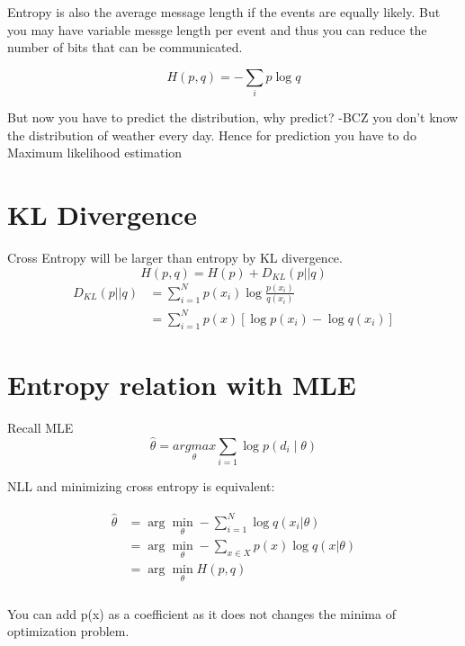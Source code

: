 Entropy is also the average message length if the events are equally likely. But you may have variable messge length per event and thus you can reduce the number of bits that can be communicated. 

\begin{equation}
    H(p,q) = - \underset{i}{\sum} p \log q
\end{equation}

But now you have to predict the distribution, why predict?  -BCZ you don't know the distribution of weather every day. Hence for prediction you have to do Maximum likelihood estimation

\section{KL Divergence}
Cross Entropy will be larger than entropy by KL divergence. 
\begin{equation}
    H(p,q) = H(p) + D_{KL}(p \vert \vert q)
\end{equation}
\begin{equation}
    \begin{split}
        D_{KL}(p \vert \vert q) & =  \sum_{i=1}^N p(x_i) \log \frac{p(x_i)}{q(x_i)} \\
        & =  \sum_{i=1}^N p(x) [\log p(x_i) - \log q(x_i)] 
    \end{split}
\end{equation}

\section{Entropy relation with MLE}
Recall MLE
\begin{equation}
    \hat{\theta} = \underset{\theta}{argmax} \sum_{i=1} \log p(d_i \mid \theta)
\end{equation}

\noindent NLL and minimizing cross entropy is equivalent:

\begin{equation}
    \begin{array}{cc}
         \begin{split}
\hat\theta & = \arg\min_{\theta} - \sum^N_{i=1} \log q(x_i \vert \theta ) \\
&  = \arg\min_{\theta} - \sum_{x \in X} p(x) \log q(x \vert \theta ) \\
& = \arg\min_{\theta} H(p, q) \\ 
\end{split} 
    \end{array}
\end{equation}

\noindent You can add p(x) as a coefficient as it does not changes the minima of optimization problem. 

